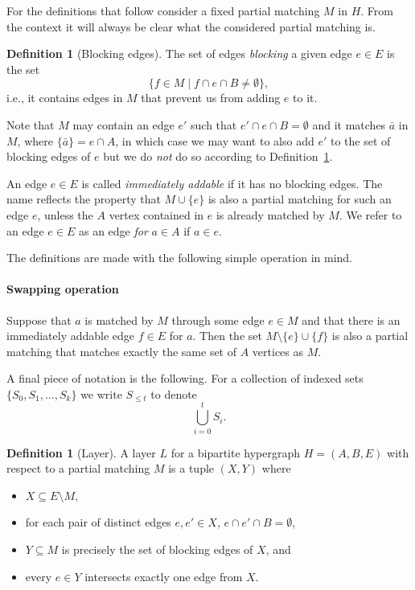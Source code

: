 \documentclass[11pt]{article}
\theoremstyle{definition}
\newtheorem{definition}[theorem]{Definition}
\theoremstyle{remark}
\begin{document}
For the definitions that follow consider a fixed partial matching
$M$ in $H$. From the context it will always be clear what the
considered partial matching is.

\begin{definition}[Blocking edges]\label{def:blocking}
The set of
edges \textit{blocking} a given edge $e\in E$ is the set
\[\{f \in M \; | \; f \cap e \cap B \not = \emptyset\},\]
i.e., it contains edges in $M$ that prevent us from adding
$e$ to it.
\end{definition}
Note that $M$ may contain an edge $e'$ such that
$e' \cap e \cap B = \emptyset$ and it matches $\bar{a}$ in $M$, where $\{\bar{a}\} = e \cap A$, in
which case we may want to also add $e'$ to the set of blocking edges
of $e$ but we do \emph{not} do so according to Definition~\ref{def:blocking}.

An edge $e \in E$ is called \textit{immediately addable} if it has no
blocking edges. The name reflects the property that $M \cup \{e\}$ is
also a partial matching for such an edge $e$, unless the $A$ vertex
contained in $e$ is already matched by $M$. We refer to an edge $e \in E$ as an edge \emph{for}
$a \in A$ if $a \in e$.



The definitions are made with the following simple operation in mind.

\paragraph{Swapping operation} Suppose that $a$ is matched by
$M$ through some edge $e \in M$ and that there is
an immediately addable edge $f \in E$ for $a$. Then the set
$M \setminus \{e\} \cup \{f\}$ is also a partial matching
that matches exactly the same set of $A$ vertices as
$M$.

A final piece of notation is the following. For a collection of
indexed sets $\{S_0,S_1,\dots,S_k\}$ we write $S_{\leq t}$ to denote
\[\bigcup_{i=0}^t S_i.\]

\begin{definition}[Layer]\label{def:layer}
  A layer $L$ for a bipartite hypergraph $H= (A,B,E)$ with respect to
  a partial matching $M$ is a tuple $(X, Y)$ where
  \begin{itemize}
  \item $X \subseteq E \setminus M$,
  \item for each pair of distinct edges   $e, e' \in X$, $e \cap e'
    \cap B = \emptyset$,
  \item $Y \subseteq M$ is precisely the set of blocking edges of $X$, and
  \item every $e \in Y$ intersects exactly one edge from $X$.
  \end{itemize}
\end{definition}
\end{document}

